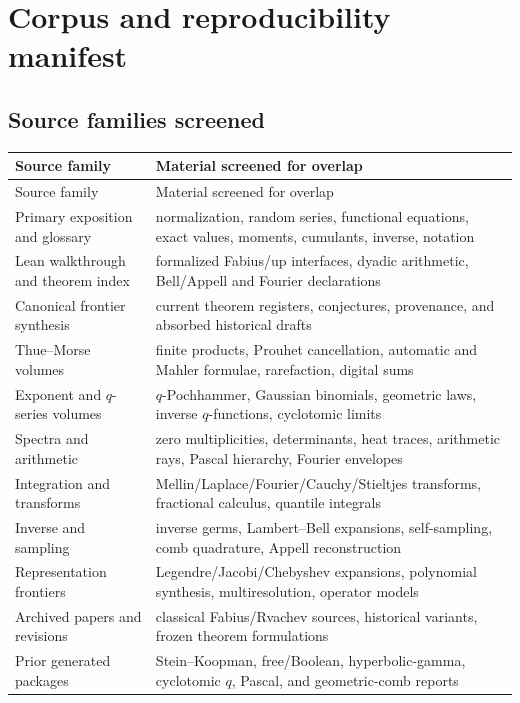 \documentclass[11pt]{article}
\numberwithin{equation}{section}
\theoremstyle{definition}
\theoremstyle{remark}
\begin{document}
\section{Corpus and reproducibility manifest}
\label{app:manifest}

\subsection{Source families screened}

\begin{longtable}{@{}p{}p{}@{}}
\toprule
Source family & Material screened for overlap \\
\midrule
\endfirsthead
\toprule Source family & Material screened for overlap \\
\midrule
\endhead
Primary exposition and glossary & normalization, random series, functional equations, exact values, moments, cumulants, inverse, notation \\
Lean walkthrough and theorem index & formalized Fabius/up interfaces, dyadic arithmetic, Bell/Appell and Fourier declarations \\
Canonical frontier synthesis & current theorem registers, conjectures, provenance, and absorbed historical drafts \\
Thue--Morse volumes & finite products, Prouhet cancellation, automatic and Mahler formulae, rarefaction, digital sums \\
Exponent and $q$-series volumes & $q$-Pochhammer, Gaussian binomials, geometric laws, inverse $q$-functions, cyclotomic limits \\
Spectra and arithmetic & zero multiplicities, determinants, heat traces, arithmetic rays, Pascal hierarchy, Fourier envelopes \\
Integration and transforms & Mellin/Laplace/Fourier/Cauchy/Stieltjes transforms, fractional calculus, quantile integrals \\
Inverse and sampling & inverse germs, Lambert--Bell expansions, self-sampling, comb quadrature, Appell reconstruction \\
Representation frontiers & Legendre/Jacobi/Chebyshev expansions, polynomial synthesis, multiresolution, operator models \\
Archived papers and revisions & classical Fabius/Rvachev sources, historical variants, frozen theorem formulations \\
Prior generated packages & Stein--Koopman, free/Boolean, hyperbolic-gamma, cyclotomic $q$, Pascal, and geometric-comb reports \\
\bottomrule
\end{longtable}
\end{document}
